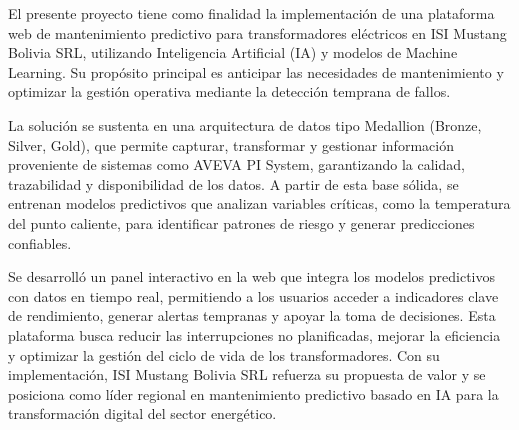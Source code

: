 \documentclass{univalle-perfil}
\begin{document}

\makecaratula

\tableofcontents



El presente proyecto tiene como finalidad la implementación de una plataforma web
de mantenimiento predictivo para transformadores eléctricos en ISI Mustang Bolivia
SRL, utilizando Inteligencia Artificial (IA) y modelos de Machine Learning. Su
propósito principal es anticipar las necesidades de mantenimiento y optimizar la
gestión operativa mediante la detección temprana de fallos.

La solución se sustenta en una arquitectura de datos tipo Medallion (Bronze, Silver,
Gold), que permite capturar, transformar y gestionar información proveniente de
sistemas como AVEVA PI System, garantizando la calidad, trazabilidad y
disponibilidad de los datos. A partir de esta base sólida, se entrenan modelos
predictivos que analizan variables críticas, como la temperatura del punto caliente,
para identificar patrones de riesgo y generar predicciones confiables.

Se desarrolló un panel interactivo en la web que integra los modelos predictivos con
datos en tiempo real, permitiendo a los usuarios acceder a indicadores clave de
rendimiento, generar alertas tempranas y apoyar la toma de decisiones. Esta
plataforma busca reducir las interrupciones no planificadas, mejorar la eficiencia y
optimizar la gestión del ciclo de vida de los transformadores. Con su implementación,
ISI Mustang Bolivia SRL refuerza su propuesta de valor y se posiciona como líder
regional en mantenimiento predictivo basado en IA para la transformación digital del
sector energético.
\end{document}
